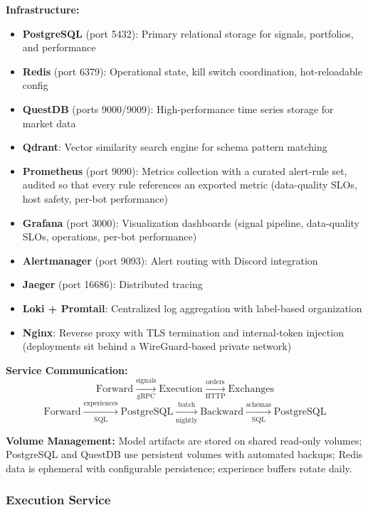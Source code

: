 \documentclass[12pt, a4paper]{article}
\begin{document}
\textbf{Infrastructure:}
\begin{itemize}
	\item \textbf{PostgreSQL} (port 5432): Primary relational storage for signals, portfolios, and performance
	\item \textbf{Redis} (port 6379): Operational state, kill switch coordination, hot-reloadable config
	\item \textbf{QuestDB} (ports 9000/9009): High-performance time series storage for market data
	\item \textbf{Qdrant}: Vector similarity search engine for schema pattern matching
	\item \textbf{Prometheus} (port 9090): Metrics collection with a curated alert-rule set, audited so that every rule references an exported metric (data-quality SLOs, host safety, per-bot performance)
	\item \textbf{Grafana} (port 3000): Visualization dashboards (signal pipeline, data-quality SLOs, operations, per-bot performance)
	\item \textbf{Alertmanager} (port 9093): Alert routing with Discord integration
	\item \textbf{Jaeger} (port 16686): Distributed tracing
	\item \textbf{Loki + Promtail}: Centralized log aggregation with label-based organization
	\item \textbf{Nginx}: Reverse proxy with TLS termination and internal-token injection (deployments sit behind a WireGuard-based private network)
\end{itemize}

\textbf{Service Communication:}
\begin{equation}
	\text{Forward} \xrightarrow[\text{gRPC}]{\text{signals}} \text{Execution} \xrightarrow[\text{HTTP}]{\text{orders}} \text{Exchanges}
\end{equation}
\begin{equation}
	\text{Forward} \xrightarrow[\text{SQL}]{\text{experiences}} \text{PostgreSQL} \xrightarrow[\text{nightly}]{\text{batch}} \text{Backward} \xrightarrow[\text{SQL}]{\text{schemas}} \text{PostgreSQL}
\end{equation}

\textbf{Volume Management:}
Model artifacts are stored on shared read-only volumes; PostgreSQL and QuestDB use persistent volumes with automated backups; Redis data is ephemeral with configurable persistence; experience buffers rotate daily.

\subsubsection{Execution Service}
\end{document}
